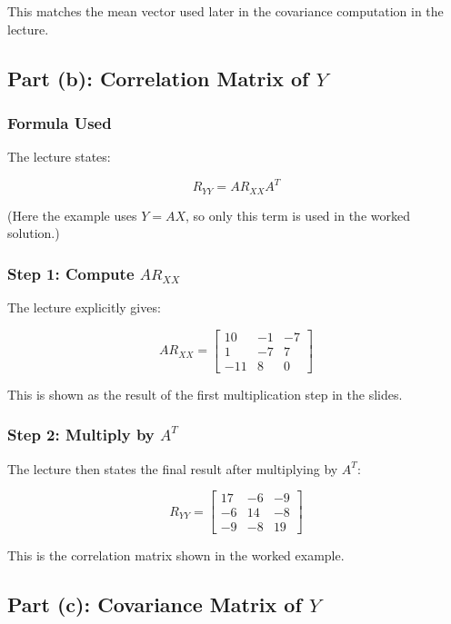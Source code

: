 \documentclass[12pt]{article}
\begin{document}
This matches the mean vector used later in the covariance computation in the lecture.

\subsection{Part (b): Correlation Matrix of \(Y\)}

\subsubsection*{Formula Used}

The lecture states:

\[
R_{YY} = A R_{XX} A^T
\]

(Here the example uses \(Y=AX\), so only this term is used in the worked solution.)

\subsubsection*{Step 1: Compute \(A R_{XX}\)}

The lecture explicitly gives:

\[
A R_{XX} =
\begin{bmatrix}
10 & -1 & -7 \\
1 & -7 & 7 \\
-11 & 8 & 0
\end{bmatrix}
\]

This is shown as the result of the first multiplication step in the slides.

\subsubsection*{Step 2: Multiply by \(A^T\)}

The lecture then states the final result after multiplying by \(A^T\):

\[
\boxed{
R_{YY} =
\begin{bmatrix}
17 & -6 & -9 \\
-6 & 14 & -8 \\
-9 & -8 & 19
\end{bmatrix}}
\]

This is the correlation matrix shown in the worked example.

\subsection{Part (c): Covariance Matrix of \(Y\)}
\end{document}

